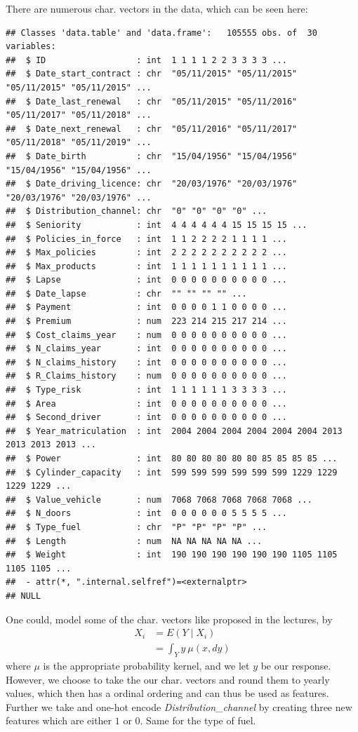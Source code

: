 \documentclass[
]{article}
\begin{document}
There are numerous char. vectors in the data, which can be seen here:

\begin{verbatim}
## Classes 'data.table' and 'data.frame':   105555 obs. of  30 variables:
##  $ ID                  : int  1 1 1 1 2 2 3 3 3 3 ...
##  $ Date_start_contract : chr  "05/11/2015" "05/11/2015" "05/11/2015" "05/11/2015" ...
##  $ Date_last_renewal   : chr  "05/11/2015" "05/11/2016" "05/11/2017" "05/11/2018" ...
##  $ Date_next_renewal   : chr  "05/11/2016" "05/11/2017" "05/11/2018" "05/11/2019" ...
##  $ Date_birth          : chr  "15/04/1956" "15/04/1956" "15/04/1956" "15/04/1956" ...
##  $ Date_driving_licence: chr  "20/03/1976" "20/03/1976" "20/03/1976" "20/03/1976" ...
##  $ Distribution_channel: chr  "0" "0" "0" "0" ...
##  $ Seniority           : int  4 4 4 4 4 4 15 15 15 15 ...
##  $ Policies_in_force   : int  1 1 2 2 2 2 1 1 1 1 ...
##  $ Max_policies        : int  2 2 2 2 2 2 2 2 2 2 ...
##  $ Max_products        : int  1 1 1 1 1 1 1 1 1 1 ...
##  $ Lapse               : int  0 0 0 0 0 0 0 0 0 0 ...
##  $ Date_lapse          : chr  "" "" "" "" ...
##  $ Payment             : int  0 0 0 0 1 1 0 0 0 0 ...
##  $ Premium             : num  223 214 215 217 214 ...
##  $ Cost_claims_year    : num  0 0 0 0 0 0 0 0 0 0 ...
##  $ N_claims_year       : int  0 0 0 0 0 0 0 0 0 0 ...
##  $ N_claims_history    : int  0 0 0 0 0 0 0 0 0 0 ...
##  $ R_Claims_history    : num  0 0 0 0 0 0 0 0 0 0 ...
##  $ Type_risk           : int  1 1 1 1 1 1 3 3 3 3 ...
##  $ Area                : int  0 0 0 0 0 0 0 0 0 0 ...
##  $ Second_driver       : int  0 0 0 0 0 0 0 0 0 0 ...
##  $ Year_matriculation  : int  2004 2004 2004 2004 2004 2004 2013 2013 2013 2013 ...
##  $ Power               : int  80 80 80 80 80 80 85 85 85 85 ...
##  $ Cylinder_capacity   : int  599 599 599 599 599 599 1229 1229 1229 1229 ...
##  $ Value_vehicle       : num  7068 7068 7068 7068 7068 ...
##  $ N_doors             : int  0 0 0 0 0 0 5 5 5 5 ...
##  $ Type_fuel           : chr  "P" "P" "P" "P" ...
##  $ Length              : num  NA NA NA NA NA ...
##  $ Weight              : int  190 190 190 190 190 190 1105 1105 1105 1105 ...
##  - attr(*, ".internal.selfref")=<externalptr> 
## NULL
\end{verbatim}

One could, model some of the char. vectors like proposed in the
lectures, by \[
\begin{aligned*}
 X_i &= E(Y \mid X_i ) \\
 &=\int_Y y\ \mu(x, dy) 
\end{aligned*}
\] where \(\mu\) is the appropriate probability kernel, and we let \(y\)
be our response. However, we choose to take the our char. vectors and
round them to yearly values, which then has a ordinal ordering and can
thus be used as features. Further we take and one-hot encode
\emph{Distribution\_channel} by creating three new features which are
either \(1\) or \(0\). Same for the type of fuel.
\end{document}

